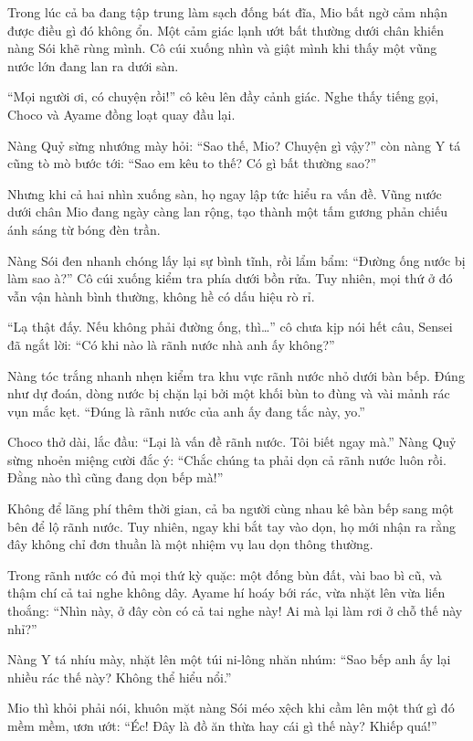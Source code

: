 \documentclass[../main.tex]{subfiles}
\begin{document}
\ct

Trong lúc cả ba đang tập trung làm sạch đống bát đĩa, Mio bất ngờ cảm nhận được điều gì đó không ổn. Một cảm giác lạnh ướt bất thường dưới chân khiến nàng Sói khẽ rùng mình. Cô cúi xuống nhìn và giật mình khi thấy một vũng nước lớn đang lan ra dưới sàn.

``Mọi người ơi, có chuyện rồi!'' cô kêu lên đầy cảnh giác. Nghe thấy tiếng gọi, Choco và Ayame đồng loạt quay đầu lại.

Nàng Quỷ sừng nhướng mày hỏi: ``Sao thế, Mio? Chuyện gì vậy?'' còn nàng Y tá cũng tò mò bước tới: ``Sao em kêu to thế? Có gì bất thường sao?''

Nhưng khi cả hai nhìn xuống sàn, họ ngay lập tức hiểu ra vấn đề. Vũng nước dưới chân Mio đang ngày càng lan rộng, tạo thành một tấm gương phản chiếu ánh sáng từ bóng đèn trần.

Nàng Sói đen nhanh chóng lấy lại sự bình tĩnh, rồi lẩm bẩm: ``Đường ống nước bị làm sao à?'' Cô cúi xuống kiểm tra phía dưới bồn rửa. Tuy nhiên, mọi thứ ở đó vẫn vận hành bình thường, không hề có dấu hiệu rò rỉ.

``Lạ thật đấy. Nếu không phải đường ống, thì\dots'' cô chưa kịp nói hết câu, Sensei đã ngắt lời: ``Có khi nào là rãnh nước nhà anh ấy không?''

Nàng tóc trắng nhanh nhẹn kiểm tra khu vực rãnh nước nhỏ dưới bàn bếp. Đúng như dự đoán, dòng nước bị chặn lại bởi một khối bùn to đùng và vài mảnh rác vụn mắc kẹt. ``Đúng là rãnh nước của anh ấy đang tắc này, yo.''

Choco thở dài, lắc đầu: ``Lại là vấn đề rãnh nước. Tôi biết ngay mà.'' Nàng Quỷ sừng nhoẻn miệng cười đắc ý: ``Chắc chúng ta phải dọn cả rãnh nước luôn rồi. Đằng nào thì cũng đang dọn bếp mà!''

Không để lãng phí thêm thời gian, cả ba người cùng nhau kê bàn bếp sang một bên để lộ rãnh nước. Tuy nhiên, ngay khi bắt tay vào dọn, họ mới nhận ra rằng đây không chỉ đơn thuần là một nhiệm vụ lau dọn thông thường.

Trong rãnh nước có đủ mọi thứ kỳ quặc: một đống bùn đất, vài bao bì cũ, và thậm chí cả tai nghe không dây. Ayame hí hoáy bới rác, vừa nhặt lên vừa liến thoắng: ``Nhìn này, ở đây còn có cả tai nghe này! Ai mà lại làm rơi ở chỗ thế này nhỉ?''

Nàng Y tá nhíu mày, nhặt lên một túi ni-lông nhăn nhúm: ``Sao bếp anh ấy lại nhiều rác thế này? Không thể hiểu nổi.''

Mio thì khỏi phải nói, khuôn mặt nàng Sói méo xệch khi cầm lên một thứ gì đó mềm mềm, ươn ướt: ``Éc! Đây là đồ ăn thừa hay cái gì thế này? Khiếp quá!''
\end{document}
